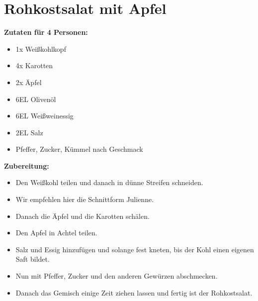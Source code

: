 \section{Rohkostsalat mit Apfel}

\textbf{Zutaten für 4 Personen:}
\begin{itemize}
  \item 1x Weißkohlkopf
  \item 4x Karotten
  \item 2x Äpfel
  \item 6EL Olivenöl
  \item 6EL Weißweinessig
  \item 2EL Salz
  \item Pfeffer, Zucker, Kümmel nach Geschmack
\end{itemize}

\textbf{Zubereitung:}
\begin{itemize}
  \item Den Weißkohl teilen und danach in dünne Streifen schneiden.
  \item Wir empfehlen hier die Schnittform Julienne.
  \item Danach die Äpfel und die Karotten schälen.
  \item Den Apfel in Achtel teilen.
  \item Salz und Essig hinzufügen und solange fest kneten, bis der Kohl einen eigenen Saft bildet.
  \item Nun mit Pfeffer, Zucker und den anderen Gewürzen abschmecken.
  \item Danach das Gemisch einige Zeit ziehen lassen und fertig ist der Rohkostsalat.
\end{itemize}
